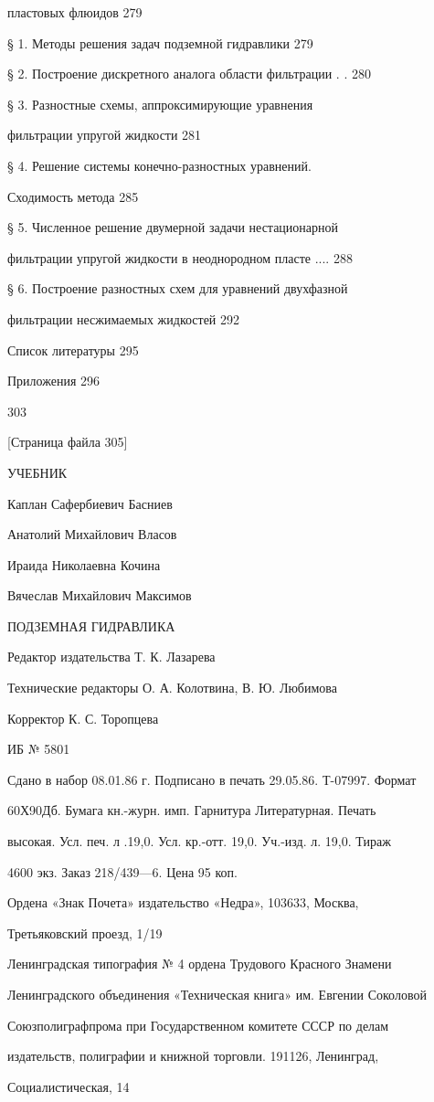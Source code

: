 \documentclass[
  11pt,
]{article}
\begin{document}
пластовых флюидов 279 \par
§ 1. Методы решения задач подземной гидравлики 279 \par
§ 2. Построение дискретного аналога области фильтрации . . 280 \par
§ 3. Разностные схемы, аппроксимирующие уравнения  \par
фильтрации упругой жидкости 281 \par
§ 4. Решение системы конечно-разностных уравнений.  \par
Сходимость метода 285 \par
§ 5. Численное решение двумерной задачи нестационарной \par
фильтрации упругой жидкости в неоднородном пласте .... 288 \par
§ 6. Построение разностных схем для уравнений двухфазной \par
фильтрации несжимаемых жидкостей 292 \par
Список литературы 295 \par
Приложения 296 \par
303 \par
\smallskip
\smallskip
\smallskip
{[}Страница файла 305{]}\par
УЧЕБНИК \par
Каплан Сафербиевич Басниев \par
Анатолий Михайлович Власов \par
Ираида Николаевна Кочина \par
Вячеслав Михайлович Максимов \par
ПОДЗЕМНАЯ ГИДРАВЛИКА \par
Редактор издательства Т. К. Лазарева \par
Технические редакторы О. А. Колотвина, В. Ю. Любимова \par
Корректор К. С. Торопцева \par
ИБ № 5801 \par
Сдано в набор 08.01.86 г. Подписано в печать 29.05.86. Т-07997. Формат \par
60Х90\textquotesingle Дб. Бумага кн.-журн. имп. Гарнитура Литературная. Печать  \par
высокая. Усл. печ. л .19,0. Усл. кр.-отт. 19,0. Уч.-изд. л. 19,0. Тираж \par
4600 экз. Заказ 218/439---6. Цена 95 коп. \par
Ордена «Знак Почета» издательство «Недра», 103633, Москва, \par
Третьяковский проезд, 1/19 \par
Ленинградская типография № 4 ордена Трудового Красного Знамени  \par
Ленинградского объединения «Техническая книга» им. Евгении Соколовой \par
Союзполиграфпрома при Государственном комитете СССР по делам  \par
издательств, полиграфии и книжной торговли. 191126, Ленинград,  \par
Социалистическая, 14\par
\endgroup
\end{document}
